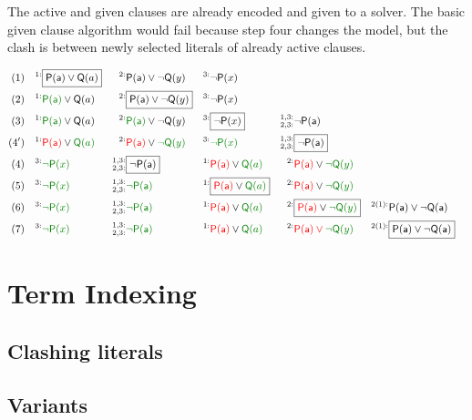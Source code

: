 \begin{example}[InstGen]The active and given clauses are already encoded and given to a \SAT solver.
	The basic given clause algorithm would fail because step four changes the model, 
	but the clash is between newly selected literals of already active clauses.
	
	\begin{align*}
	(1)\quad^{1:}&\boxed{\mP(\ma)\lor\mQ(a)} & ^{2:}&\mP(\ma)\lor\lnot\mQ(y) & ^{3:}&\lnot\mP(x)
	\\
	(2)\quad^{1:}&{\colHi\mP(\ma)}\lor\mQ(a) & ^{2:}&\boxed{\mP(\ma)\lor\lnot\mQ(y)} & ^{3:}&\lnot\mP(x) 
	\\
	(3)\quad^{1:}&{\colHi\mP(\ma)}\lor\mQ(a) & ^{2:}&{\colHi\mP(\ma)}\lor\lnot\mQ(y) & ^{3:}&\boxed{\lnot\mP(x)} 
	& ^{1,3:}_{2,3:}&\lnot\mP(\ma)
	\\
	(4')\quad
	^{1:}&{\colLo\mP(\ma)}\lor\colHi\mQ(a) & ^{2:}&{\colLo\mP(\ma)}\lor\colHi\lnot\mQ(y) & ^{3:}&{\colHi\lnot\mP(x)} 
	& ^{1,3:}_{2,3:}&\boxed{\lnot\mP(\ma)}
	\\
	(4)\quad^{3:}&{\colHi\lnot\mP(x)} 
	& ^{1,3:}_{2,3:}&\boxed{\lnot\mP(\ma)}
	& ^{1:}&{\colLo\mP(\ma)}\lor\colHi\mQ(a) & ^{2:}&{\colLo\mP(\ma)}\lor\colHi\lnot\mQ(y)
	\\
	(5)\quad^{3:}&{\colHi\lnot\mP(x)} 
	& ^{1,3:}_{2,3:}&\colHi\lnot\mP(\ma)
	& ^{1:}&\boxed{{\colLo\mP(\ma)}\lor\colHi\mQ(a)} & ^{2:}&{\colLo\mP(\ma)}\lor\colHi\lnot\mQ(y)
	\\
	(6)\quad^{3:}&{\colHi\lnot\mP(x)} 
	& ^{1,3:}_{2,3:}&\colHi\lnot\mP(\ma)
	& ^{1:}&{\colLo\mP(\ma)}\lor\colHi\mQ(a) & ^{2:}&\boxed{{\colLo\mP(\ma)}\lor\colHi\lnot\mQ(y)}
	& ^{2(1):}&\mP(\ma)\lor\lnot\mQ(\ma)
	\\
	(7)\quad^{3:}&{\colHi\lnot\mP(x)} 
	& ^{1,3:}_{2,3:}&\colHi\lnot\mP(\ma)
	& ^{1:}&{\colLo\mP(\ma)}\lor\colHi\mQ(a) & ^{2:}&{\colLo\mP(\ma)\lor\colHi\lnot\mQ(y)}
	& ^{2(1):}&\boxed{\mP(\ma)\lor\lnot\mQ(\ma)}
	\end{align*}
\end{example}

\section{Term Indexing}

\subsection{Clashing literals}

\subsection{Variants}



